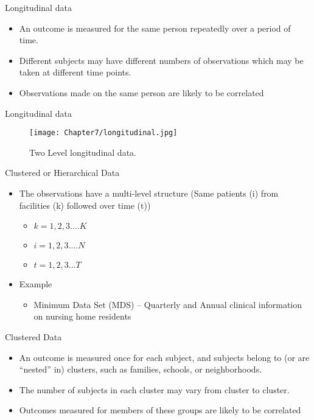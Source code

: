\documentclass{beamer}
\begin{document}
\begin{frame}{Longitudinal data}
\begin{itemize}
	\item An outcome is measured for the same person repeatedly over a period of time. \vspace{0.25cm}
	\item Different subjects may have different numbers of observations which may be taken at different time points. \vspace{0.25cm}
	\item Observations made on the same person are likely to be correlated
\end{itemize}
\end{frame}

\begin{frame}{Longitudinal data}
\begin{figure}[h!]
\centering
\texttt{[image: Chapter7/longitudinal.jpg]}
\caption{Two Level longitudinal data. \label{long}}
\end{figure}
\end{frame}

\begin{frame}{Clustered or Hierarchical Data}
\begin{itemize}
	\item The observations have a multi-level structure (Same patients (i) from facilities (k) followed over time (t))
	\begin{itemize}
		\item $k = 1,2,3…. K$
		\item $i = 1,2,3…. N$
		\item $t = 1,2,3… T$
	\end{itemize}
	\item Example
	\begin{itemize}
		\item Minimum Data Set (MDS) – Quarterly and Annual  clinical information on nursing home residents 
	\end{itemize}
\end{itemize}
\end{frame}

\begin{frame}{Clustered Data}
\begin{itemize}
	\item An outcome is measured once for each subject, and subjects belong to (or are “nested” in) clusters, such as families, schools, or neighborhoods.\vspace{0.25cm}
	\item The number of subjects in each cluster may vary from cluster to cluster. \vspace{0.25cm}
	\item Outcomes measured for members of these groups are likely to be correlated
\end{itemize}
\end{frame}
\end{document}
